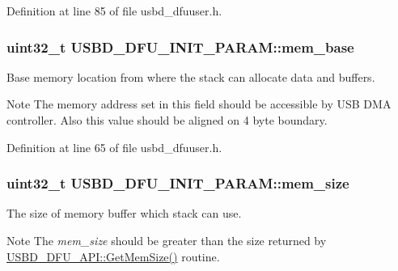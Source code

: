 Definition at line 85 of file usbd\+\_\+dfuuser.\+h.

\subsubsection[{\texorpdfstring{mem\+\_\+base}{mem_base}}]{\setlength{\rightskip}{0pt plus 5cm}uint32\+\_\+t U\+S\+B\+D\+\_\+\+D\+F\+U\+\_\+\+I\+N\+I\+T\+\_\+\+P\+A\+R\+A\+M\+::mem\+\_\+base}\hypertarget{structUSBD__DFU__INIT__PARAM_a00d172e271b0f2272b052f479c3d2439}{}\label{structUSBD__DFU__INIT__PARAM_a00d172e271b0f2272b052f479c3d2439}
Base memory location from where the stack can allocate data and buffers. \begin{DoxyNote}{Note}
The memory address set in this field should be accessible by U\+SB D\+MA controller. Also this value should be aligned on 4 byte boundary. 
\end{DoxyNote}


Definition at line 65 of file usbd\+\_\+dfuuser.\+h.

\subsubsection[{\texorpdfstring{mem\+\_\+size}{mem_size}}]{\setlength{\rightskip}{0pt plus 5cm}uint32\+\_\+t U\+S\+B\+D\+\_\+\+D\+F\+U\+\_\+\+I\+N\+I\+T\+\_\+\+P\+A\+R\+A\+M\+::mem\+\_\+size}\hypertarget{structUSBD__DFU__INIT__PARAM_a4624ef53dbdf39e27314fa7b19d6720d}{}\label{structUSBD__DFU__INIT__PARAM_a4624ef53dbdf39e27314fa7b19d6720d}
The size of memory buffer which stack can use. \begin{DoxyNote}{Note}
The {\itshape mem\+\_\+size} should be greater than the size returned by \hyperlink{structUSBD__DFU__API_a91b64bb4209cfa9e3254bd3ba8963cdc}{U\+S\+B\+D\+\_\+\+D\+F\+U\+\_\+\+A\+P\+I\+::\+Get\+Mem\+Size()} routine. 
\end{DoxyNote}


